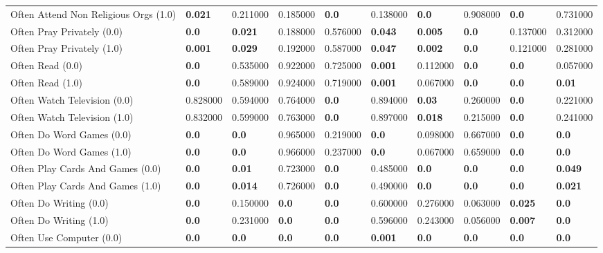 \begin{tabular}{llllllllll}
Often Attend Non Religious Orgs (1.0) & \textbf{0.021} & 0.211000 & 0.185000 & \textbf{0.0} & 0.138000 & \textbf{0.0} & 0.908000 & \textbf{0.0} & 0.731000 \\
Often Pray Privately (0.0) & \textbf{0.0} & \textbf{0.021} & 0.188000 & 0.576000 & \textbf{0.043} & \textbf{0.005} & \textbf{0.0} & 0.137000 & 0.312000 \\
Often Pray Privately (1.0) & \textbf{0.001} & \textbf{0.029} & 0.192000 & 0.587000 & \textbf{0.047} & \textbf{0.002} & \textbf{0.0} & 0.121000 & 0.281000 \\
Often Read (0.0) & \textbf{0.0} & 0.535000 & 0.922000 & 0.725000 & \textbf{0.001} & 0.112000 & \textbf{0.0} & \textbf{0.0} & 0.057000 \\
Often Read (1.0) & \textbf{0.0} & 0.589000 & 0.924000 & 0.719000 & \textbf{0.001} & 0.067000 & \textbf{0.0} & \textbf{0.0} & \textbf{0.01} \\
Often Watch Television (0.0) & 0.828000 & 0.594000 & 0.764000 & \textbf{0.0} & 0.894000 & \textbf{0.03} & 0.260000 & \textbf{0.0} & 0.221000 \\
Often Watch Television (1.0) & 0.832000 & 0.599000 & 0.763000 & \textbf{0.0} & 0.897000 & \textbf{0.018} & 0.215000 & \textbf{0.0} & 0.241000 \\
Often Do Word Games (0.0) & \textbf{0.0} & \textbf{0.0} & 0.965000 & 0.219000 & \textbf{0.0} & 0.098000 & 0.667000 & \textbf{0.0} & \textbf{0.0} \\
Often Do Word Games (1.0) & \textbf{0.0} & \textbf{0.0} & 0.966000 & 0.237000 & \textbf{0.0} & 0.067000 & 0.659000 & \textbf{0.0} & \textbf{0.0} \\
Often Play Cards And Games (0.0) & \textbf{0.0} & \textbf{0.01} & 0.723000 & \textbf{0.0} & 0.485000 & \textbf{0.0} & \textbf{0.0} & \textbf{0.0} & \textbf{0.049} \\
Often Play Cards And Games (1.0) & \textbf{0.0} & \textbf{0.014} & 0.726000 & \textbf{0.0} & 0.490000 & \textbf{0.0} & \textbf{0.0} & \textbf{0.0} & \textbf{0.021} \\
Often Do Writing (0.0) & \textbf{0.0} & 0.150000 & \textbf{0.0} & \textbf{0.0} & 0.600000 & 0.276000 & 0.063000 & \textbf{0.025} & \textbf{0.0} \\
Often Do Writing (1.0) & \textbf{0.0} & 0.231000 & \textbf{0.0} & \textbf{0.0} & 0.596000 & 0.243000 & 0.056000 & \textbf{0.007} & \textbf{0.0} \\
Often Use Computer (0.0) & \textbf{0.0} & \textbf{0.0} & \textbf{0.0} & \textbf{0.0} & \textbf{0.001} & \textbf{0.0} & \textbf{0.0} & \textbf{0.0} & \textbf{0.0} \\

\end{tabular}
